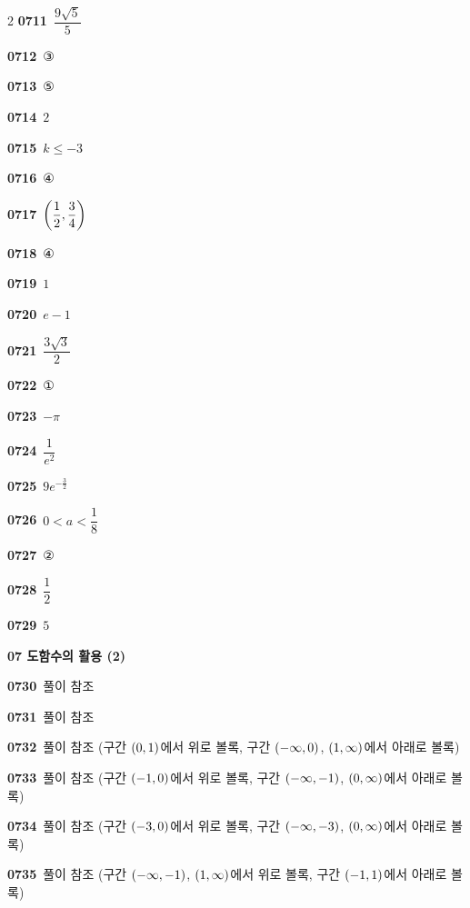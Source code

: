 \documentclass[10pt,a4paper]{article}
\begin{document}
\begin{multicols}{2}
\noindent\textbf{0711}\ $\dfrac{9\sqrt{5}}{5}$\par
\noindent\textbf{0712}\ ③\par
\noindent\textbf{0713}\ ⑤\par
\noindent\textbf{0714}\ $2$\par
\noindent\textbf{0715}\ $k\le -3$\par
\noindent\textbf{0716}\ ④\par
\noindent\textbf{0717}\ $\left(\dfrac{1}{2}{,}\mkern3mu\mathopen{}\dfrac{3}{4}\right)$\par
\noindent\textbf{0718}\ ④\par
\noindent\textbf{0719}\ $1$\par
\noindent\textbf{0720}\ $e-1$\par
\noindent\textbf{0721}\ $\dfrac{3\sqrt{3}}{2}$\par
\noindent\textbf{0722}\ ①\par
\noindent\textbf{0723}\ $-\pi$\par
\noindent\textbf{0724}\ $\dfrac{1}{e^2}$\par
\noindent\textbf{0725}\ $9e^{-\frac{3}{2}}$\par
\noindent\textbf{0726}\ $0<a<\dfrac{1}{8}$\par
\noindent\textbf{0727}\ ②\par
\noindent\textbf{0728}\ $\dfrac{1}{2}$\par
\noindent\textbf{0729}\ $5$\par
\noindent\textbf{07 도함수의 활용 (2)}\par\smallskip
\noindent\textbf{0730}\ 풀이 참조\par
\noindent\textbf{0731}\ 풀이 참조\par
\noindent\textbf{0732}\ 풀이 참조 (구간 $(0{,}\mkern3mu\mathopen{}1)$에서 위로 볼록, 구간 $(-\infty{,}\mkern3mu\mathopen{}0)$, $(1{,}\mkern3mu\mathopen{}\infty)$에서 아래로 볼록)\par
\noindent\textbf{0733}\ 풀이 참조 (구간 $(-1{,}\mkern3mu\mathopen{}0)$에서 위로 볼록, 구간 $(-\infty{,}\mkern3mu\mathopen{}-1)$, $(0{,}\mkern3mu\mathopen{}\infty)$에서 아래로 볼록)\par
\noindent\textbf{0734}\ 풀이 참조 (구간 $(-3{,}\mkern3mu\mathopen{}0)$에서 위로 볼록, 구간 $(-\infty{,}\mkern3mu\mathopen{}-3)$, $(0{,}\mkern3mu\mathopen{}\infty)$에서 아래로 볼록)\par
\noindent\textbf{0735}\ 풀이 참조 (구간 $(-\infty{,}\mkern3mu\mathopen{}-1)$, $(1{,}\mkern3mu\mathopen{}\infty)$에서 위로 볼록, 구간 $(-1{,}\mkern3mu\mathopen{}1)$에서 아래로 볼록)\par

\end{multicols}
\end{document}
